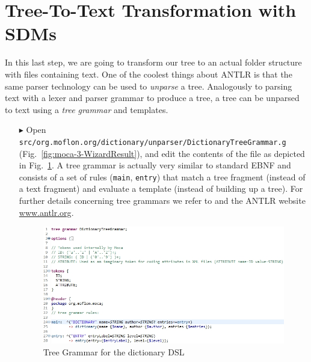 \section{Tree-To-Text Transformation with SDMs}
\label{chap:tree-to-text}

In this last step, we are going to transform our tree to an actual folder structure with files containing text.
One of the coolest things about ANTLR is that the same parser technology can be used to \emph{unparse} a tree.
Analogously to parsing text with a lexer and parser grammar to produce a tree, a tree can be unparsed to text using a \emph{tree grammar} and templates.
\begin{enumerate}
\item[$\blacktriangleright$] Open \texttt{src/org.moflon.org/dictionary/unparser/Dictionary\-Tree\-Grammar.g} (Fig.~\ref{fig:moca-3-WizardResult}), and edit the contents of the file as depicted in Fig.~\ref{fig:moca-DictionaryTreeGrammar}.
A tree grammar is actually very similar to standard EBNF and consists of a set of rules (\texttt{main}, \texttt{entry}) that match a tree fragment (instead of a text fragment) and evaluate a template (instead of building up a tree).
For further details concerning tree grammars we refer to \cite{ANTLR} and the
ANTLR website \url{www.antlr.org}.

\begin{figure}[!htbp]
\begin{center}
 \includegraphics[width=\textwidth]{pics/moca/5MocaTreeToText/DictionaryTreeGrammar}
  \caption{Tree Grammar for the dictionary DSL} 
  \label{fig:moca-DictionaryTreeGrammar}
\end{center}
\end{figure} 


\end{enumerate}

